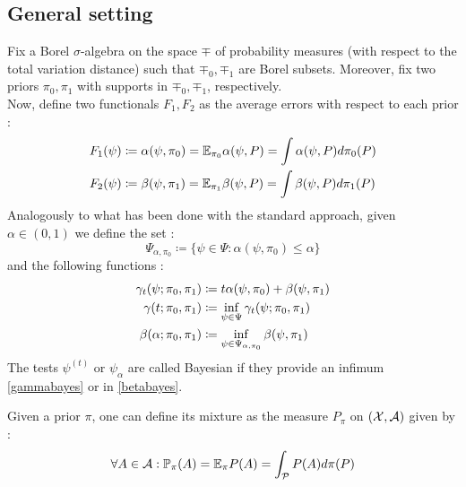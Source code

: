 \subsection{General setting}
Fix a Borel $\sigma$-algebra on the space $\mp$ of probability measures (with respect to the total variation distance) such that $\mp_0,\mp_1$ are Borel subsets. Moreover, fix two priors $\pi_0,\pi_1$ with supports in $\mp_0,\mp_1$, respectively. \\
Now, define two functionals $F_1,F_2$ as the average errors with respect to each prior : 
\begin{equation}\label{bayesdef}
    \begin{aligned}
         F_1(\psi) &\coloneqq \alpha(\psi, \pi_0) = \mathbb{E}_{\pi_0} \alpha(\psi,P) = \int \alpha(\psi,P)d\pi_0(P)\\
         F_2(\psi) &\coloneqq \beta(\psi,\pi_1) = \mathbb{E}_{\pi_1} \beta(\psi,P) = \int \beta(\psi,P)d\pi_1(P)
    \end{aligned}
\end{equation}
Analogously to what has been done with the standard approach, given $\alpha \in \left(0,1\right)$ we define the set : 
\begin{equation}\label{setprior}
\Psi_{\alpha,\pi_0} \coloneqq \bigl\{\psi \in \Psi : \alpha(\psi,\pi_0) \leq \alpha \bigr\}
\end{equation}
and the following functions : 
\begin{align}
    \gamma_t(\psi;\pi_0,\pi_1) &\coloneqq t\alpha(\psi,\pi_0) + \beta(\psi,\pi_1) \notag\\
    \gamma(t;\pi_0,\pi_1) &\coloneqq \inf_{\psi \in \Psi} \gamma_t(\psi;\pi_0,\pi_1) \label{gammabayes}\\
    \beta(\alpha;\pi_0,\pi_1) &\coloneqq \inf_{\psi \in \Psi_{\alpha,\pi_0}} \beta(\psi,\pi_1) \label{betabayes}
\end{align}
The tests $\psi^{(t)}$ or $\psi_\alpha$ are called Bayesian if they provide an infimum \cref{gammabayes} or in \cref{betabayes}. 
\begin{definition} 
    Given a prior $\pi$, one can define its mixture as the measure $P_\pi$ on $(\mathcal{X},\mathcal{A})$ given by : 
    \begin{equation*}
        \forall A \in \mathcal{A} : \mathbb{P}_\pi (A) = \mathbb{E}_\pi P(A) = \int_{\mathcal{P}} P(A) d\pi(P)
    \end{equation*}
\end{definition}

